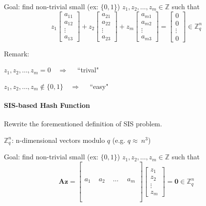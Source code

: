 Goal: find non-trivial small (ex: \(\{0, 1\}\)) \(z_1, z_2, \ldots, z_m \in \mathbb{Z}\) such that
\[
	z_1 \begin{bmatrix} a_{11} \\ a_{12} \\ \vdots \\ a_{13} \end{bmatrix}
	+ z_2 \begin{bmatrix} a_{21} \\ a_{22} \\ \vdots \\ a_{23} \end{bmatrix} 
	+ z_m \begin{bmatrix} a_{m1} \\ a_{m2} \\ \vdots \\ a_{m3} \end{bmatrix}
	= \begin{bmatrix} 0 \\ 0 \\ \vdots \\ 0 \end{bmatrix}
	\in \mathbb{Z}_q^n
\]

Remark:
\begin{myItemize}
	\item \(z_1, z_2, \ldots, z_m = 0 \quad \Rightarrow \quad\) ``trival"
	\item \(z_1, z_2, \ldots, z_m \not\in \{0, 1\} \quad \Rightarrow \quad\) ``easy"
\end{myItemize}


\paragraph{SIS-based Hash Function}

Rewrite the forementioned definition of SIS problem.

\(\mathbb{Z}_q^n\): n-dimensional vectors modulo \(q\) (e.g. \(q \approx\ n^3\))

Goal: find non-trivial small (ex: \(\{0, 1\}\)) \(z_1, z_2, \ldots, z_m \in \mathbb{Z}\) such that
\[
	\mathbf{A} \mathbf{z} = 
	\begin{bmatrix}
		\phantom{a_11} & \phantom{a_{12}} & \phantom{a_{13}} & \phantom{a_{14}} \\
		\phantom{a_11} & \phantom{a_{12}} & \phantom{a_{13}} & \phantom{a_{14}} \\
		a_1 & a_2 & \ldots & a_m \\
		\phantom{a_11} & \phantom{a_{12}} & \phantom{a_{13}} & \phantom{a_{14}} \\
		\phantom{a_11} & \phantom{a_{12}} & \phantom{a_{13}} & \phantom{a_{14}} \\
	\end{bmatrix}
	\begin{bmatrix}
		z_1 \\ z_2 \\ \vdots \\ z_m
	\end{bmatrix}
	= \mathbf{0}
	\in \mathbb{Z}_q^n
\]

